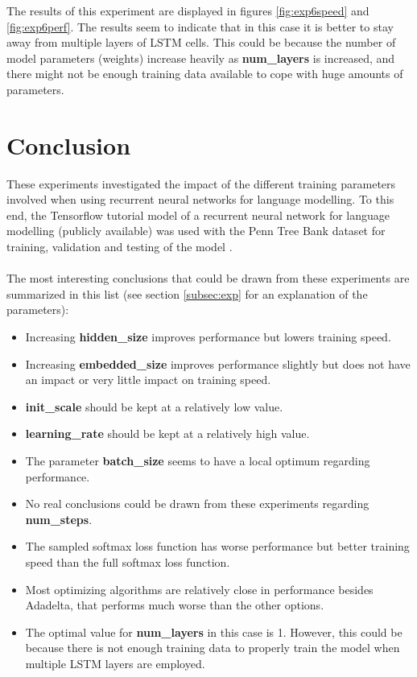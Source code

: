\documentclass[10pt,a4paper,titlepage]{article}
\begin{document}
The results of this experiment are displayed in figures \ref{fig:exp6speed} and \ref{fig:exp6perf}. The results seem to indicate that in this case it is better to stay away from multiple layers of LSTM cells. This could be because the number of model parameters (weights) increase heavily as \textbf{num\_layers} is increased, and there might not be enough training data available to cope with huge amounts of parameters.

\newpage
\section{Conclusion}

These experiments investigated the impact of the different training parameters involved when using recurrent neural networks for language modelling. To this end, the Tensorflow tutorial model of a recurrent neural network for language modelling (publicly available) was used with the Penn Tree Bank dataset for training, validation and testing of the model \cite{tensorflow}.\\
\\
The most interesting conclusions that could be drawn from these experiments are summarized in this list (see section \ref{subsec:exp} for an explanation of the parameters):

\begin{itemize}
	\item Increasing \textbf{hidden\_size} improves performance but lowers training speed.
	\item Increasing \textbf{embedded\_size} improves performance slightly but does not have an impact or very little impact on training speed.
	\item \textbf{init\_scale} should be kept at a relatively low value.	
	\item \textbf{learning\_rate} should be kept at a relatively high value.
	\item The parameter \textbf{batch\_size} seems to have a local optimum regarding performance.
	\item No real conclusions could be drawn from these experiments regarding \textbf{num\_steps}. 
	\item The sampled softmax loss function has worse performance but better training speed than the full softmax loss function. 
	\item Most optimizing algorithms are relatively close in performance besides Adadelta, that performs much worse than the other options.
	\item The optimal value for \textbf{num\_layers} in this case is 1. However, this could be because there is not enough training data to properly train the model when multiple LSTM layers are employed.
\end{itemize}
\end{document}
